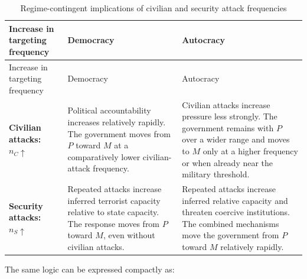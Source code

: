 \documentclass[
  letterpaper,
  DIV=11,
  numbers=noendperiod]{scrartcl}
\begin{document}
\begin{longtable}[]{@{}
  >{\raggedright\arraybackslash}p{}
  >{\raggedright\arraybackslash}p{}
  >{\raggedright\arraybackslash}p{}@{}}
\caption{Regime-contingent implications of civilian and security attack
frequencies}\tabularnewline
\toprule\noalign{}
\begin{minipage}[b]{\linewidth}\raggedright
Increase in targeting frequency
\end{minipage} & \begin{minipage}[b]{\linewidth}\raggedright
Democracy
\end{minipage} & \begin{minipage}[b]{\linewidth}\raggedright
Autocracy
\end{minipage} \\
\midrule\noalign{}
\endfirsthead
\toprule\noalign{}
\begin{minipage}[b]{\linewidth}\raggedright
Increase in targeting frequency
\end{minipage} & \begin{minipage}[b]{\linewidth}\raggedright
Democracy
\end{minipage} & \begin{minipage}[b]{\linewidth}\raggedright
Autocracy
\end{minipage} \\
\midrule\noalign{}
\endhead
\bottomrule\noalign{}
\endlastfoot
\textbf{Civilian attacks:} \(n_C\uparrow\) & Political accountability
increases relatively rapidly. The government moves from \(P\) toward
\(M\) at a comparatively lower civilian-attack frequency. & Civilian
attacks increase pressure less strongly. The government remains with
\(P\) over a wider range and moves to \(M\) only at a higher frequency
or when already near the military threshold. \\
\textbf{Security attacks:} \(n_S\uparrow\) & Repeated attacks increase
inferred terrorist capacity relative to state capacity. The response
moves from \(P\) toward \(M\), even without civilian attacks. & Repeated
attacks increase inferred relative capacity and threaten coercive
institutions. The combined mechanisms move the government from \(P\)
toward \(M\) relatively rapidly. \\
\end{longtable}

The same logic can be expressed compactly as:
\end{document}

